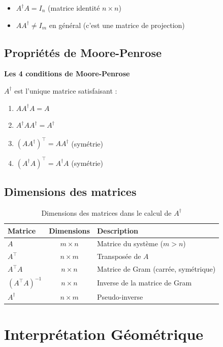 \documentclass[12pt,a4paper]{article}
\newcommand{\T}{^\top}
\newcommand{\pinv}{^\dagger}
\begin{document}
\begin{itemize}
    \item $A\pinv A = I_n$ (matrice identité $n \times n$)
    \item $A A\pinv \neq I_m$ en général (c'est une matrice de projection)
\end{itemize}

\subsection{Propriétés de Moore-Penrose}

\begin{theorembox}
\textbf{Les 4 conditions de Moore-Penrose}

$A\pinv$ est l'unique matrice satisfaisant :
\begin{enumerate}
    \item $A A\pinv A = A$
    \item $A\pinv A A\pinv = A\pinv$
    \item $(A A\pinv)\T = A A\pinv$ \quad (symétrie)
    \item $(A\pinv A)\T = A\pinv A$ \quad (symétrie)
\end{enumerate}
\end{theorembox}

\subsection{Dimensions des matrices}

\begin{table}[H]
\centering
\begin{tabular}{|l|c|l|}
\hline
\textbf{Matrice} & \textbf{Dimensions} & \textbf{Description} \\
\hline
$A$ & $m \times n$ & Matrice du système ($m > n$) \\
$A\T$ & $n \times m$ & Transposée de $A$ \\
$A\T A$ & $n \times n$ & Matrice de Gram (carrée, symétrique) \\
$(A\T A)^{-1}$ & $n \times n$ & Inverse de la matrice de Gram \\
$A\pinv$ & $n \times m$ & Pseudo-inverse \\
\hline
\end{tabular}
\caption{Dimensions des matrices dans le calcul de $A\pinv$}
\end{table}

\newpage
\section{Interprétation Géométrique}
\end{document}
